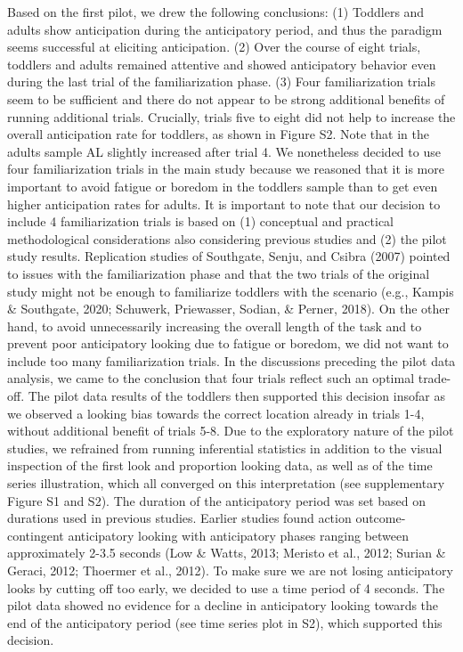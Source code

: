 \documentclass[
  man, donotrepeattitle,floatsintext]{apa6}
\begin{document}
Based on the first pilot, we drew the following conclusions: (1) Toddlers and adults show anticipation during the anticipatory period, and thus the paradigm seems successful at eliciting anticipation. (2) Over the course of eight trials, toddlers and adults remained attentive and showed anticipatory behavior even during the last trial of the familiarization phase. (3) Four familiarization trials seem to be sufficient and there do not appear to be strong additional benefits of running additional trials. Crucially, trials five to eight did not help to increase the overall anticipation rate for toddlers, as shown in Figure S2. Note that in the adults sample AL slightly increased after trial 4. We nonetheless decided to use four familiarization trials in the main study because we reasoned that it is more important to avoid fatigue or boredom in the toddlers sample than to get even higher anticipation rates for adults.
It is important to note that our decision to include 4 familiarization trials is based on (1) conceptual and practical methodological considerations also considering previous studies and (2) the pilot study results. Replication studies of Southgate, Senju, and Csibra (2007) pointed to issues with the familiarization phase and that the two trials of the original study might not be enough to familiarize toddlers with the scenario (e.g., Kampis \& Southgate, 2020; Schuwerk, Priewasser, Sodian, \& Perner, 2018). On the other hand, to avoid unnecessarily increasing the overall length of the task and to prevent poor anticipatory looking due to fatigue or boredom, we did not want to include too many familiarization trials. In the discussions preceding the pilot data analysis, we came to the conclusion that four trials reflect such an optimal trade-off. The pilot data results of the toddlers then supported this decision insofar as we observed a looking bias towards the correct location already in trials 1-4, without additional benefit of trials 5-8. Due to the exploratory nature of the pilot studies, we refrained from running inferential statistics in addition to the visual inspection of the first look and proportion looking data, as well as of the time series illustration, which all converged on this interpretation (see supplementary Figure S1 and S2).
The duration of the anticipatory period was set based on durations used in previous studies. Earlier studies found action outcome-contingent anticipatory looking with anticipatory phases ranging between approximately 2-3.5 seconds (Low \& Watts, 2013; Meristo et al., 2012; Surian \& Geraci, 2012; Thoermer et al., 2012). To make sure we are not losing anticipatory looks by cutting off too early, we decided to use a time period of 4 seconds. The pilot data showed no evidence for a decline in anticipatory looking towards the end of the anticipatory period (see time series plot in S2), which supported this decision.
\end{document}
